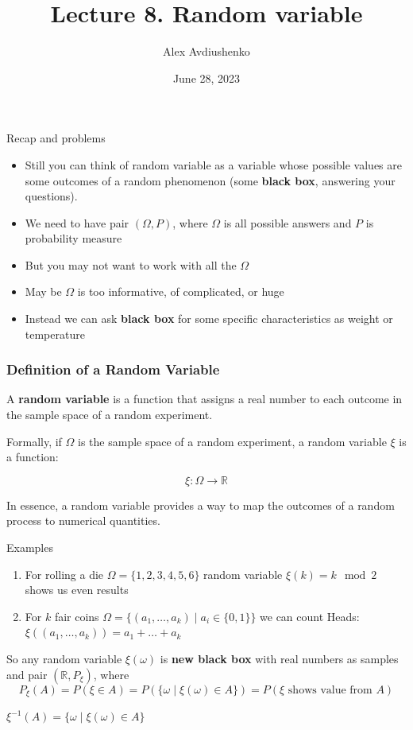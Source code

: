 \documentclass[fullscreen=true, bookmarks=true, hyperref={pdfencoding=unicode}]{beamer}
\title{Lecture 8. Random variable}
\author{Alex Avdiushenko}
\institute{Neapolis University Paphos}
\date{June 28, 2023}
\begin{document}
\begin{frame}
\transdissolve[duration=0.2]
\titlepage
\end{frame}


\begin{frame}{Recap and problems}
  \begin{itemize}
    \pause\item Still you can think of random variable as a variable whose possible values 
    are some outcomes of a random phenomenon (some \textbf{black box}, answering your questions).
    \pause\item We need to have pair $(\Omega, P)$, where $\Omega$ is all possible answers and $P$ is probability measure
    \pause\item But you may not want to work with all the $\Omega$ 
    \pause\item May be $\Omega$ is too informative, of complicated, or huge
    \pause\item Instead we can ask \textbf{black box} for some specific characteristics as weight or temperature
  \end{itemize}
\end{frame}


\begin{frame}
  \frametitle{Definition of a Random Variable}
  
  A \textbf{random variable} is a function that assigns a real number to each outcome in the sample space of a random experiment. 
  
  Formally, if $\Omega$ is the sample space of a random experiment, 
  a random variable $\xi$ is a function:
  
  \[
    \xi : \Omega \rightarrow \mathbb{R}
  \]
  
  In essence, a random variable provides a way to map the outcomes of a random process to numerical quantities.
  
\end{frame}


\begin{frame}{Examples}

  \begin{enumerate}
    \item For rolling a die $\Omega = \{1, 2, 3, 4, 5, 6\}$ random variable 
    $\xi(k) = k \mod 2$ shows us even results
    \item For $k$ fair coins $\Omega = \{(a_1, \dots, a_k) \mid a_i \in \{0, 1\}\}$ we can count Heads:
    $\xi((a_1, \dots, a_k)) = a_1 + \dots + a_k$
  \end{enumerate}

  \vspace{1cm}
  So any random variable $\xi(\omega)$ is \textbf{new black box} with 
  real numbers as samples and pair $(\mathbb{R}, P_\xi)$, where
  $$ P_\xi(A) = P(\xi \in A) = P(\{\omega\mid \xi(\omega) \in A \}) = P(\xi \text{ shows value from } A)$$

  $\xi^{-1}(A) = \{\omega\mid \xi(\omega) \in A \}$
\end{frame}
\end{document}
